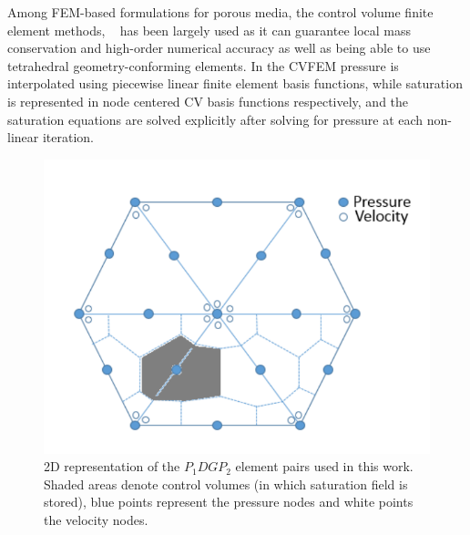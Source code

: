 \documentclass[preprint,authoryear,12pt]{elsarticle}
\newcommand{\PN}[2][error]{P$_{#1}$DG-P$_{#2}$}
\newcommand{\PNDG}[2][error]{P$_{#1}$DG-P$_{#2}$DG}
\begin{document}
\medskip
Among FEM-based formulations for porous media, the control volume finite element methods, ~\citep[CVFEM,][]{fung_1992} has been largely used as it can guarantee local mass conservation and high-order numerical accuracy as well as being able to use tetrahedral geometry-conforming elements. In the CVFEM pressure is interpolated using piecewise linear finite element basis functions, %
while saturation is represented in node centered CV basis functions respectively, and the saturation equations are solved explicitly after solving for pressure at each non-linear iteration. 



\begin{figure}[h]
\centering
\vbox{\includegraphics[width=.5\textwidth]{./Pics/P1DGP2.pdf}}
\caption{2D representation of the $P_{1}DGP_{2}$ element pairs used in this work. Shaded areas denote control volumes (in which saturation field is stored), blue points represent the pressure nodes and white points the velocity nodes.}
\label{fig:fem_cv}
\end{figure}
\end{document}
